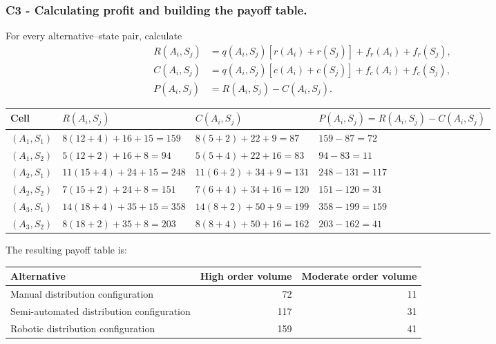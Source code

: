 
\subsubsection*{C3 - Calculating profit and building the payoff table.}
\label{subsec:problem20-distribution-centre-automation-c3}

For every alternative--state pair, calculate
\[
\begin{aligned}
	R(A_i,S_j)
	&=
	q(A_i,S_j)
	\left[
	r(A_i)+r(S_j)
	\right]
	+
	f_r(A_i)
	+
	f_r(S_j),
	\\
	C(A_i,S_j)
	&=
	q(A_i,S_j)
	\left[
	c(A_i)+c(S_j)
	\right]
	+
	f_c(A_i)
	+
	f_c(S_j),
	\\
	P(A_i,S_j)
	&=
	R(A_i,S_j)-C(A_i,S_j).
\end{aligned}
\]

\begin{center}
	\small
	\begin{tabular}{llll}
		\toprule
		Cell
		& \(R(A_i,S_j)\)
		& \(C(A_i,S_j)\)
		& \(P(A_i,S_j)=R(A_i,S_j)-C(A_i,S_j)\) \\
		\midrule
		\((A_1,S_1)\)
		& \(8(12+4)+16+15=159\)
		& \(8(5+2)+22+9=87\)
		& \(159-87=72\) \\
		
		\((A_1,S_2)\)
		& \(5(12+2)+16+8=94\)
		& \(5(5+4)+22+16=83\)
		& \(94-83=11\) \\
		
		\((A_2,S_1)\)
		& \(11(15+4)+24+15=248\)
		& \(11(6+2)+34+9=131\)
		& \(248-131=117\) \\
		
		\((A_2,S_2)\)
		& \(7(15+2)+24+8=151\)
		& \(7(6+4)+34+16=120\)
		& \(151-120=31\) \\
		
		\((A_3,S_1)\)
		& \(14(18+4)+35+15=358\)
		& \(14(8+2)+50+9=199\)
		& \(358-199=159\) \\
		
		\((A_3,S_2)\)
		& \(8(18+2)+35+8=203\)
		& \(8(8+4)+50+16=162\)
		& \(203-162=41\) \\
		\bottomrule
	\end{tabular}
\end{center}

The resulting payoff table is:

\begin{center}
	\begin{tabular}{lrr}
		\toprule
		Alternative
		& High order volume
		& Moderate order volume \\
		\midrule
		Manual distribution configuration & 72 & 11 \\
		Semi-automated distribution configuration & 117 & 31 \\
		Robotic distribution configuration & 159 & 41 \\
		\bottomrule
	\end{tabular}
\end{center}

